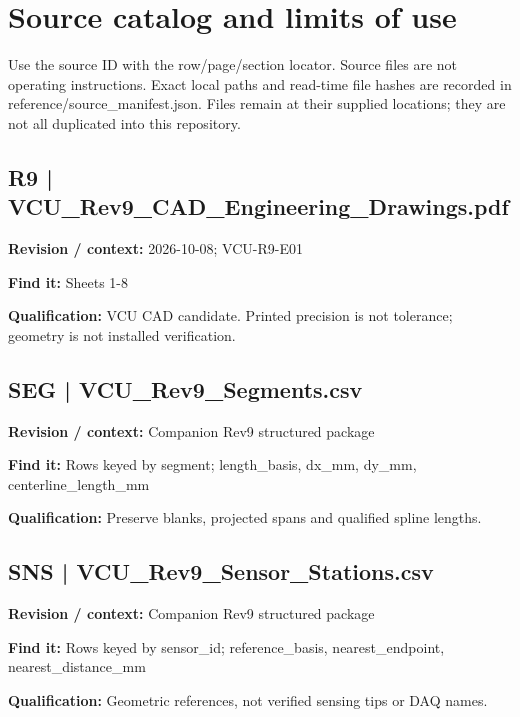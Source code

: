 \documentclass[11pt]{article}
\begin{document}
\clearpage\section{Source catalog and limits of use}
Use the source ID with the row/page/section locator. Source files are not operating instructions. Exact local paths and read-time file hashes are recorded in reference/source\_manifest.json. Files remain at their supplied locations; they are not all duplicated into this repository.
\par\noindent\begin{minipage}{\textwidth}\small
\subsection*{R9 | VCU\_\allowbreak{}Rev9\_\allowbreak{}CAD\_\allowbreak{}Engineering\_\allowbreak{}Drawings.pdf}
\textbf{Revision / context:} 2026-10-08; VCU-R9-E01\par
\textbf{Find it:} Sheets 1-8\par
\textbf{Qualification:} VCU CAD candidate. Printed precision is not tolerance; geometry is not installed verification.\par
\end{minipage}\par\vspace{5pt}
\par\noindent\begin{minipage}{\textwidth}\small
\subsection*{SEG | VCU\_\allowbreak{}Rev9\_\allowbreak{}Segments.csv}
\textbf{Revision / context:} Companion Rev9 structured package\par
\textbf{Find it:} Rows keyed by segment; length\_\allowbreak{}basis, dx\_\allowbreak{}mm, dy\_\allowbreak{}mm, centerline\_\allowbreak{}length\_\allowbreak{}mm\par
\textbf{Qualification:} Preserve blanks, projected spans and qualified spline lengths.\par
\end{minipage}\par\vspace{5pt}
\par\noindent\begin{minipage}{\textwidth}\small
\subsection*{SNS | VCU\_\allowbreak{}Rev9\_\allowbreak{}Sensor\_\allowbreak{}Stations.csv}
\textbf{Revision / context:} Companion Rev9 structured package\par
\textbf{Find it:} Rows keyed by sensor\_\allowbreak{}id; reference\_\allowbreak{}basis, nearest\_\allowbreak{}endpoint, nearest\_\allowbreak{}distance\_\allowbreak{}mm\par
\textbf{Qualification:} Geometric references, not verified sensing tips or DAQ names.\par
\end{minipage}\par\vspace{5pt}
\end{document}

